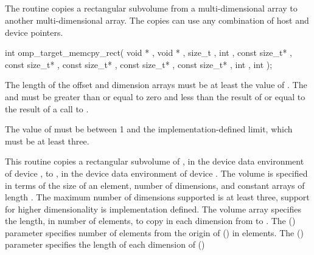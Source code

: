 \pagebreak
{}
\vspace{-1\baselineskip}
\subsection{}
\label{subsec:omp_target_memcpy_rect}
\summary

The  routine copies a rectangular subvolume from
a multi-dimensional array to another multi-dimensional array. The copies can
use any combination of host and device pointers.

\format
\begin{samepage}
\begin{boxedcode}
int omp\_target\_memcpy\_rect(
               void * , void * ,
               size\_t ,
               int ,
               const size\_t* ,
               const size\_t* ,
               const size\_t* ,
               const size\_t* ,
               const size\_t* ,
               int , int );
\end{boxedcode}
\end{samepage}

\constraints
The length of the offset and dimension arrays must be at least the
value of .
The  and 
must be greater than or equal to zero and less than the result of
 or equal to the result of a call to
.

The value of  must be between 1 and the implementation-defined
limit, which must be at least three.


\pagebreak
{}
\effect

This routine copies a rectangular subvolume of ,
in the device data environment of device ,
to , in the device data environment of device .
The volume is specified in terms of the size of an element, 
number of dimensions, and constant arrays of length .  The 
maximum number of dimensions supported is at least three, support for higher 
dimensionality is implementation defined. The volume array specifies the 
length, in number of elements, to copy in each dimension from  
to . The  () parameter specifies
number of elements from the origin of  () in elements.  
The  () parameter specifies the 
length of each dimension of  ()

